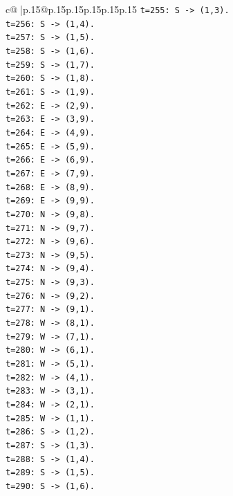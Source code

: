 \documentclass{article}
\begin{document}
{\begin{supertabular}{c@{$\;$}|p{.15\linewidth}@{}p{.15\linewidth}p{.15\linewidth}p{.15\linewidth}p{.15\linewidth}p{.15\linewidth}}
{{{\texttt{t=255: S {-}> (1,3).} \\
\texttt{t=256: S {-}> (1,4).} \\
\texttt{t=257: S {-}> (1,5).} \\
\texttt{t=258: S {-}> (1,6).} \\
\texttt{t=259: S {-}> (1,7).} \\
\texttt{t=260: S {-}> (1,8).} \\
\texttt{t=261: S {-}> (1,9).} \\
\texttt{t=262: E {-}> (2,9).} \\
\texttt{t=263: E {-}> (3,9).} \\
\texttt{t=264: E {-}> (4,9).} \\
\texttt{t=265: E {-}> (5,9).} \\
\texttt{t=266: E {-}> (6,9).} \\
\texttt{t=267: E {-}> (7,9).} \\
\texttt{t=268: E {-}> (8,9).} \\
\texttt{t=269: E {-}> (9,9).} \\
\texttt{t=270: N {-}> (9,8).} \\
\texttt{t=271: N {-}> (9,7).} \\
\texttt{t=272: N {-}> (9,6).} \\
\texttt{t=273: N {-}> (9,5).} \\
\texttt{t=274: N {-}> (9,4).} \\
\texttt{t=275: N {-}> (9,3).} \\
\texttt{t=276: N {-}> (9,2).} \\
\texttt{t=277: N {-}> (9,1).} \\
\texttt{t=278: W {-}> (8,1).} \\
\texttt{t=279: W {-}> (7,1).} \\
\texttt{t=280: W {-}> (6,1).} \\
\texttt{t=281: W {-}> (5,1).} \\
\texttt{t=282: W {-}> (4,1).} \\
\texttt{t=283: W {-}> (3,1).} \\
\texttt{t=284: W {-}> (2,1).} \\
\texttt{t=285: W {-}> (1,1).} \\
\texttt{t=286: S {-}> (1,2).} \\
\texttt{t=287: S {-}> (1,3).} \\
\texttt{t=288: S {-}> (1,4).} \\
\texttt{t=289: S {-}> (1,5).} \\
\texttt{t=290: S {-}> (1,6).} \\
}}}
\end{supertabular}}
\end{document}
